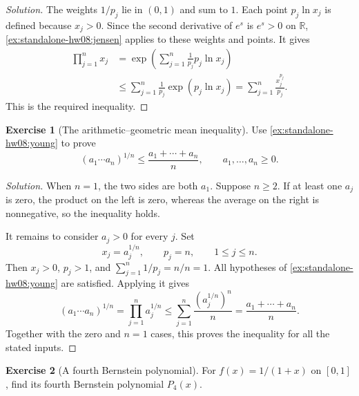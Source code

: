 \documentclass[11pt,letterpaper]{article}
\newcommand{\R}{\mathbb{R}}
\theoremstyle{definition}
\newtheorem{exercise}{Exercise}
\begin{document}
\begin{proof}[Solution]
  The weights $1/p_j$ lie in $(0,1)$ and sum to $1$. Each point
  $p_j\ln x_j$ is defined because $x_j>0$. Since the second derivative
  of $e^s$ is $e^s>0$ on $\R$, \autoref{ex:standalone-hw08:jensen}
  applies to these weights and points. It gives
  \[
    \begin{aligned}
      \prod_{j=1}^{n}x_j
        &=\exp\left(\sum_{j=1}^{n}\frac1{p_j}p_j\ln x_j\right)\\
        &\le\sum_{j=1}^{n}\frac1{p_j}\exp(p_j\ln x_j)
          =\sum_{j=1}^{n}\frac{x_j^{p_j}}{p_j}.
    \end{aligned}
  \]
  This is the required inequality.
\end{proof}

\begin{exercise}[The arithmetic--geometric mean inequality]
  \label{ex:standalone-hw08:am-gm}
  Use \autoref{ex:standalone-hw08:young} to prove
  \[
    (a_1\cdots a_n)^{1/n}\le\frac{a_1+\cdots+a_n}{n},
    \qquad a_1,\ldots,a_n\ge0.
  \]
\end{exercise}

\begin{proof}[Solution]
  When $n=1$, the two sides are both $a_1$. Suppose $n\ge2$.
  If at least one $a_j$ is zero, the product on the left is zero,
  whereas the average on the right is nonnegative, so the inequality
  holds.

  It remains to consider $a_j>0$ for every $j$. Set
  \[
    x_j=a_j^{1/n},\qquad p_j=n,\qquad 1\le j\le n.
  \]
  Then $x_j>0$, $p_j>1$, and
  $\sum_{j=1}^{n}1/p_j=n/n=1$. All hypotheses of
  \autoref{ex:standalone-hw08:young} are satisfied. Applying it gives
  \[
    (a_1\cdots a_n)^{1/n}
      =\prod_{j=1}^{n}a_j^{1/n}
      \le\sum_{j=1}^{n}\frac{(a_j^{1/n})^n}{n}
      =\frac{a_1+\cdots+a_n}{n}.
  \]
  Together with the zero and $n=1$ cases, this proves the inequality
  for all the stated inputs.
\end{proof}

\begin{exercise}[A fourth Bernstein polynomial]
  \label{ex:standalone-hw08:bernstein-reciprocal}
  For $f(x)=1/(1+x)$ on $[0,1]$, find its fourth Bernstein polynomial
  $P_4(x)$.
\end{exercise}
\end{document}
